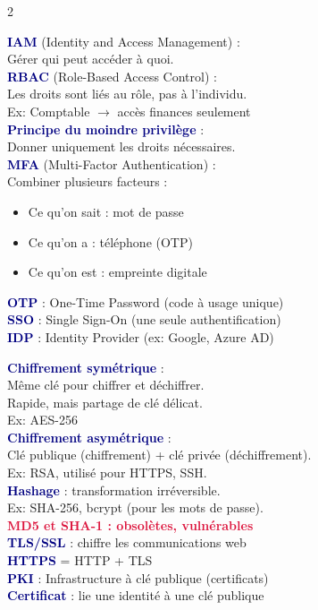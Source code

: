 \documentclass[a4paper,10pt]{article}
\newcommand{\key}[1]{\textbf{\textcolor{navy}{#1}}}
\newcommand{\warn}[1]{\textbf{\textcolor{crimson}{#1}}}
\begin{document}
\begin{multicols}{2}
\begin{tcolorbox}[basebox, colframe=navy, title=3. Gestion des accès et identités]
\key{IAM} (Identity and Access Management) :\\
Gérer qui peut accéder à quoi.\\[4pt]
\key{RBAC} (Role-Based Access Control) :\\
Les droits sont liés au rôle, pas à l'individu.\\
Ex: Comptable $\to$ accès finances seulement\\[4pt]
\key{Principe du moindre privilège} :\\
Donner uniquement les droits nécessaires.\\[4pt]
\key{MFA} (Multi-Factor Authentication) :\\
Combiner plusieurs facteurs :
\begin{itemize}
  \item Ce qu'on sait : mot de passe
  \item Ce qu'on a : téléphone (OTP)
  \item Ce qu'on est : empreinte digitale
\end{itemize}
\key{OTP} : One-Time Password (code à usage unique) \\
\key{SSO} : Single Sign-On (une seule authentification) \\
\key{IDP} : Identity Provider (ex: Google, Azure AD)
\end{tcolorbox}

\begin{tcolorbox}[basebox, colframe=green, title=4. Chiffrement et cryptographie]
\key{Chiffrement symétrique} :\\
Même clé pour chiffrer et déchiffrer.\\
Rapide, mais partage de clé délicat.\\
Ex: AES-256\\[4pt]
\key{Chiffrement asymétrique} :\\
Clé publique (chiffrement) + clé privée (déchiffrement).\\
Ex: RSA, utilisé pour HTTPS, SSH.\\[4pt]
\key{Hashage} : transformation irréversible.\\
Ex: SHA-256, bcrypt (pour les mots de passe).\\
\warn{MD5 et SHA-1 : obsolètes, vulnérables}\\[4pt]
\key{TLS/SSL} : chiffre les communications web \\
\key{HTTPS} = HTTP + TLS \\
\key{PKI} : Infrastructure à clé publique (certificats)\\
\key{Certificat} : lie une identité à une clé publique
\end{tcolorbox}


\end{multicols}
\end{document}
